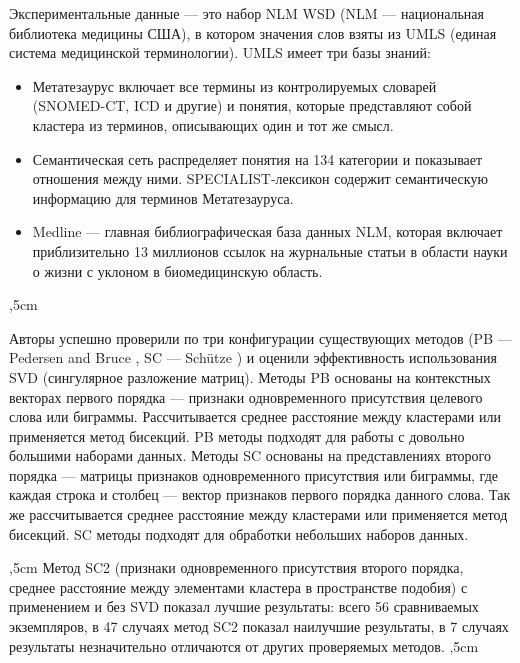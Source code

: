 \documentclass{article}
\begin{document}
\begin{articletext}
Экспериментальные данные --- это набор NLM WSD \cite{UMLS:website} (NLM --- национальная библиотека медицины США), в котором значения слов взяты из UMLS (единая система медицинской терминологии). UMLS имеет три базы знаний: 
\begin{itemize}
\item Метатезаурус включает все термины из контролируемых словарей (SNOMED-CT, ICD и другие) и понятия, которые представляют собой кластера из терминов, описывающих один и тот же смысл. 
\item Семантическая сеть распределяет понятия на 134 категории и показывает отношения между ними. SPECIALIST-лексикон содержит семантическую информацию для терминов Метатезауруса. 
\item Medline --- главная библиографическая база данных NLM, которая включает приблизительно 13 миллионов ссылок на журнальные статьи в области науки о жизни с уклоном в биомедицинскую область.
\end{itemize}
,5cm

Авторы успешно проверили по три конфигурации существующих методов (PB --- Pedersen and Bruce \cite{Pedersen 1997}, SC --- Sch\"utze \cite{Schutze 1998}) и оценили эффективность использования SVD (сингулярное разложение матриц). Методы PB основаны на контекстных векторах первого порядка --- признаки одновременного присутствия целевого слова или биграммы. Рассчитывается среднее расстояние между кластерами или применяется  метод бисекций. PB методы подходят для работы с довольно большими наборами данных. Методы SC основаны на представлениях второго порядка --- матрицы признаков одновременного присутствия или биграммы, где каждая строка и столбец --- вектор признаков первого порядка данного слова. Так же рассчитывается среднее расстояние между кластерами или применяется  метод бисекций. SC методы подходят для обработки небольших наборов данных.  

,5cm
Метод SC2 (признаки одновременного присутствия второго порядка, среднее расстояние между элементами кластера в пространстве подобия) с применением и без SVD показал лучшие результаты: всего 56 сравниваемых экземпляров, в 47 случаях метод SC2 показал наилучшие результаты, в 7 случаях результаты незначительно отличаются от других проверяемых методов.
,5cm


\end{articletext}
\end{document}
